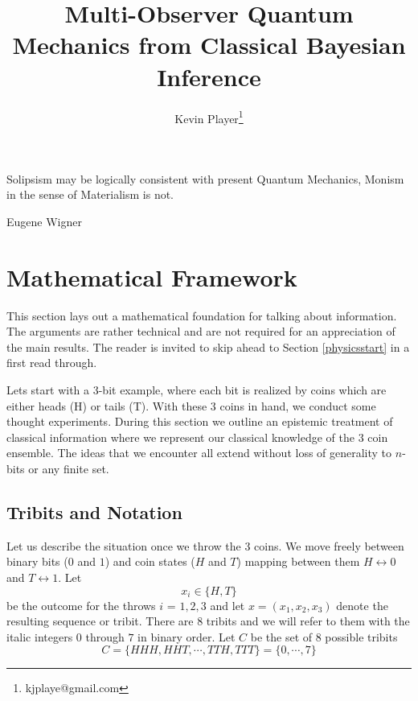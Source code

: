 \documentclass[12pt,a4paper]{article}
\theoremstyle{myrule}
\theoremstyle{postulate}
\theoremstyle{definition}
\begin{document}
\title{Multi-Observer Quantum Mechanics from Classical Bayesian Inference}
\author[1]{Kevin Player\footnote{kjplaye@gmail.com}}

\maketitle


\epigraph{Solipsism may be logically consistent with present Quantum Mechanics, Monism in the sense of Materialism is not.}{Eugene Wigner}


\section{Mathematical Framework}
This section lays out a mathematical foundation for talking about information. The arguments are rather technical and are not required for an appreciation of the main results.  The reader is invited to skip ahead to Section \ref{physicsstart} in a first read through.

Lets start with a 3-bit example, where each bit is realized by coins which are either heads (H) or tails (T).  With these 3 coins in hand, we conduct some thought experiments.  During this section we outline an epistemic treatment of classical information where we represent our classical knowledge of the 3 coin ensemble. The ideas that we encounter all extend without loss of generality to $n$-bits or any finite set.

\subsection{Tribits and Notation}
Let us describe the situation once we throw the 3 coins.  We move freely between binary bits ($0$ and $1$) and coin states ($H$ and $T$) mapping between them $H \leftrightarrow 0$ and $T \leftrightarrow 1$. Let
\[
x_i \in \{H,T\}
\]
be the outcome for the throws $i$ = $1,2,3$ and let $x = (x_1, x_2, x_3)$ denote the resulting sequence or tribit.  There are 8 tribits and we will refer to them with the italic integers $\mathit{0}$ through $\mathit{7}$ in binary order.  Let $C$ be the set of 8 possible tribits
\[
 C = \{HHH,HHT,\cdots,TTH, TTT\} = \{\mathit{0},\cdots,\mathit{7}\}
\]
  
\end{document}
